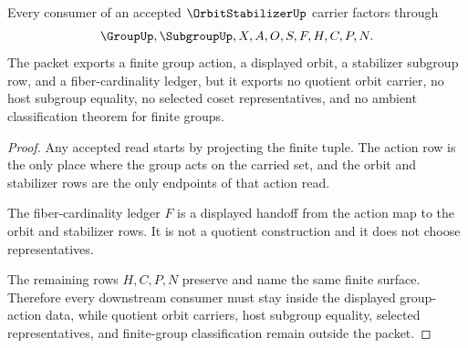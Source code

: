 \begin{theorem}
\label{thm:orbit-stabilizer-action-nonescape}
Every consumer of an accepted $\OrbitStabilizerUp$ carrier factors through
$$
\GroupUp,\SubgroupUp,X,A,O,S,F,H,C,P,N .
$$
The packet exports a finite group action, a displayed orbit, a stabilizer subgroup row, and a fiber-cardinality ledger, but it exports no quotient orbit carrier, no host subgroup equality, no selected coset representatives, and no ambient classification theorem for finite groups.
\end{theorem}
\begin{proof}
Any accepted read starts by projecting the finite tuple. The action row is the only place where the group acts on the carried set, and the orbit and stabilizer rows are the only endpoints of that action read.

The fiber-cardinality ledger $F$ is a displayed handoff from the action map to the orbit and stabilizer rows. It is not a quotient construction and it does not choose representatives.

The remaining rows $H,C,P,N$ preserve and name the same finite surface. Therefore every downstream consumer must stay inside the displayed group-action data, while quotient orbit carriers, host subgroup equality, selected representatives, and finite-group classification remain outside the packet.
\end{proof}


\begin{closurestatus}{\OrbitStabilizerUp}
  \theoryclosure{\seedClosure}
  \formalstatus{\unformalizedV}
\end{closurestatus}
